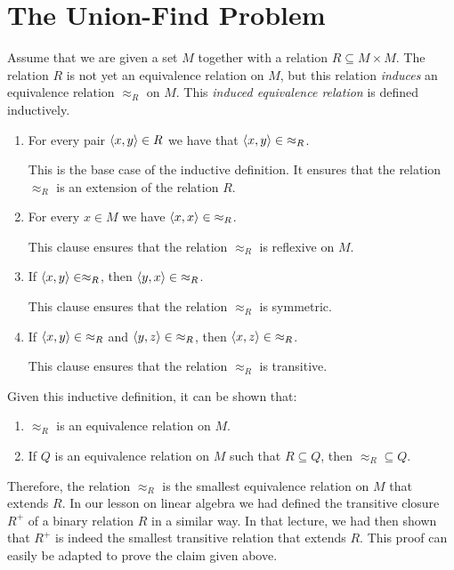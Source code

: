 \section{The Union-Find Problem}
Assume that we are given a set $M$ together with a relation $R \subseteq M \times M$.  The relation
$R$ is not yet an  equivalence relation on $M$, but this relation \emph{induces} an equivalence relation
$\approx_R$ on $M$.  This \emph{induced equivalence relation} is defined inductively.
\begin{enumerate}
\item For every pair $\pair(x,y) \in R$ we have that $\pair(x, y) \in\; \approx_R$.

      This is the base case of the inductive definition.  It ensures that the relation
      $\approx_R$ is an extension of the relation $R$.
\item For every $x \in M$ we have $\pair(x,x) \in\; \approx_R$.

      This clause ensures that the relation $\approx_R$ is reflexive on $M$.
\item If $\pair(x,y) \in \approx_R$, then $\pair(y,x) \in\; \approx_R$.

      This clause ensures that the relation $\approx_R$ is symmetric.
\item If $\pair(x,y) \in\; \approx_R$ and $\pair(y,z) \in\; \approx_R$, then $\pair(x,z) \in\; \approx_R$.

      This clause ensures that the relation $\approx_R$ is transitive.
\end{enumerate}
Given this inductive definition, it can be shown that:
\begin{enumerate}
\item $\approx_R$ is an equivalence relation on $M$.
\item If $Q$ is an equivalence relation on $M$ such that $R \subseteq Q$, then $\approx_R \subseteq Q$.
\end{enumerate}
Therefore, the relation $\approx_R$ is the smallest
equivalence relation on $M$ that extends $R$.  In our lesson on linear
algebra we had defined the transitive closure $R^+$ of a binary relation $R$ in a similar way.  In
that lecture, we had then shown that $R^+$ is indeed the smallest transitive relation that extends
$R$.  This proof can easily be adapted to prove the claim given above.

